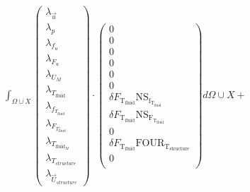 \documentclass[10pt]{article} %
\begin{document}
\begin{center}
	$\int_{\Omega \cup X}
	\begin{pmatrix}
		\lambda_{\vec{u}} \\ \lambda_p \\ \lambda_{f_u} \\ \lambda_{F_u} \\ \lambda_{U_M}\\ \lambda_{T_{\text{fluid}}} \\ \lambda_{f_{T_{\text{fluid}}}} \\ \lambda_{F_{T_{\text{fluid}}}} \\ \lambda_{T_{\text{fluid}_M}} \\ \lambda_{T_{structure}} \\ \lambda_{\vec{U}_{structure}}
	\end{pmatrix}
	\cdot
	\begin{pmatrix}
		0 \\
		0\\
		0 \\
		0 \\
		0 \\
		0 \\
		\delta F_{\text{T}_{\text{fluid}}} \text{NS}_{\text{f}_{\text{T}_{\text{fluid}}}}\\
		\delta F_{\text{T}_{\text{fluid}}} \text{NS}_{\text{F}_{\text{T}_{\text{fluid}}}}\\
		0\\
		\delta F_{\text{T}_{\text{fluid}}} \text{FOUR}_{\text{T}_{\text{structure}}}\\
		0\\
	\end{pmatrix}
	d\Omega \cup X + $\\


\end{center}
\end{document}
